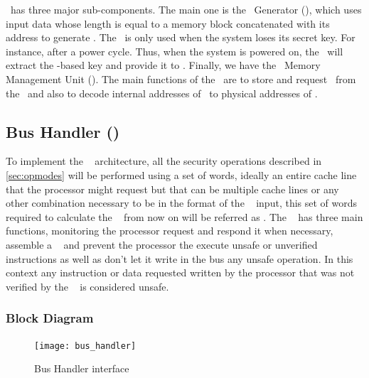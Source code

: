 \seceng~has three major sub-components. The main one is the \ptag~Generator (\ptaggen), which uses input data whose length is equal to a memory block concatenated with its address to generate \ptags. The \fuzzy~is only used when the system loses its secret key. For instance, after a power cycle. Thus, when the system is powered on, the \fuzzy~will extract the \puf-based key and provide it to \ptaggen. Finally, we have the \ptag~Memory Management Unit (\pmmu). The main functions of the \pmmu~are to store and request \ptags~from the \ptagmem~and also to decode internal addresses of \ptags~to physical addresses of \ptagmem. 


\subsection{Bus Handler (\handler)}
\label{subsec:bushandler}
To implement the \cshia~ architecture, all the security operations described in \ref{sec:opmodes} will be performed using a set of words, ideally an entire cache line that the processor might request but that can be multiple cache lines or any other combination necessary to be in the format of the \seceng~ input, this set of words required to calculate the \ptags~ from now on will be referred as \sline.  The \handler~ has three main functions, monitoring the processor request and respond it when necessary, assemble a \sline~  and prevent the processor the execute unsafe or unverified instructions  as well as don't let  it  write in the bus any unsafe operation. In this context any instruction or data requested written by the processor that was not verified by the \seceng~ is considered unsafe.



\subsubsection{Block Diagram}

\begin{figure}[!ht]
	\centering
	\texttt{[image: bus\_handler]}
    \caption{Bus Handler  interface }
	\label{fig:bhbb}
\end{figure}


